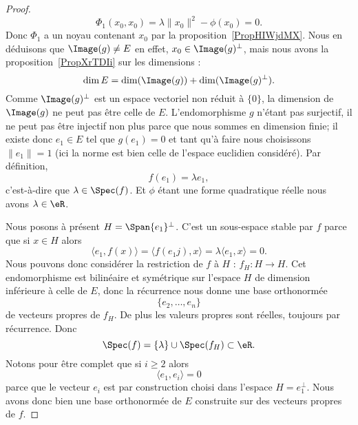 \begin{proof}
	\begin{equation}
		\Phi_1(x_0,x_0)=\lambda\| x_0 \|^2-\phi(x_0)=0.
	\end{equation}
	Donc \( \Phi_1\) a un noyau contenant \( x_0\) par la proposition~\ref{PropHIWjdMX}. Nous en déduisons que \( \Image(g)\neq E\) en effet, \( x_0\in\Image(g)^{\perp}\), mais nous avons la proposition~\ref{PropXrTDIi} sur les dimensions :
	\begin{equation}
		\dim E=\dim(\Image(g))+\dim( \Image(g)^{\perp}).
	\end{equation}
	Comme \( \Image(g)^{\perp}\) est un espace vectoriel non réduit à \( \{ 0 \}\), la dimension de \( \Image(g)\) ne peut pas être celle de \( E\). L'endomorphisme \( g\) n'étant pas surjectif, il ne peut pas être injectif non plus parce que nous sommes en dimension finie; il existe donc \( e_1\in E\) tel que \( g(e_1)=0\) et tant qu'à faire nous choisissons \( \| e_1 \|=1\) (ici la norme est bien celle de l'espace euclidien considéré). Par définition,
	\begin{equation}
		f(e_1)=\lambda e_1,
	\end{equation}
	c'est-à-dire que \( \lambda\in\Spec(f)\). Et \( \phi\) étant une forme quadratique réelle nous avons \( \lambda\in \eR\).

	Nous posons à présent \( H=\Span\{ e_1 \}^{\perp}\). C'est un sous-espace stable par \( f\) parce que si \( x\in H\) alors
	\begin{equation}
		\langle e_1, f(x)\rangle =\langle f(e_1j),x\rangle =\lambda\langle e_1, x\rangle =0.
	\end{equation}
	Nous pouvons donc considérer la restriction de \( f\) à \( H\) : \( f_H\colon H\to H\). Cet endomorphisme est bilinéaire et symétrique sur l'espace \( H\) de dimension inférieure à celle de \( E\), donc la récurrence nous donne une base orthonormée
	\begin{equation}
		\{ e_2,\ldots, e_n \}
	\end{equation}
	de vecteurs propres de \( f_H\). De plus les valeurs propres sont réelles, toujours par récurrence. Donc
	\begin{equation}
		\Spec(f)=\{ \lambda \}\cup\Spec(f_H)\subset \eR.
	\end{equation}
	Notons pour être complet que si \( i\geq 2\) alors
	\begin{equation}
		\langle e_1, e_i\rangle =0
	\end{equation}
	parce que le vecteur \( e_i\) est par construction choisi dans l'espace \( H=e_1^{\perp}\). Nous avons donc bien une base orthonormée de \( E\) construite sur des vecteurs propres de \( f\).
\end{proof}


